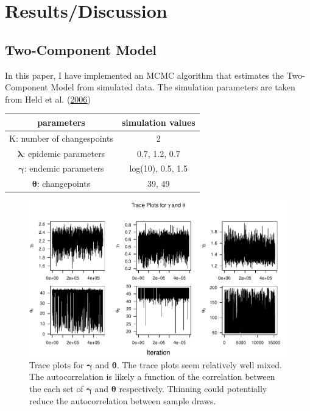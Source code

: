 \documentclass[11pt,a4paper]{article}
\numberwithin{equation}{section}
\begin{document}
\hypertarget{resultsdiscussion}{%
\section{Results/Discussion}\label{resultsdiscussion}}

\hypertarget{two-component-model}{%
\subsection{Two-Component Model}\label{two-component-model}}

In this paper, I have implemented an MCMC algorithm that estimates the
Two-Component Model from simulated data. The simulation parameters are
taken from Held et al.
(\protect\hyperlink{ref-held_two-component_2006}{2006})

\begin{longtable}[]{@{}cc@{}}
\toprule
parameters & simulation values\tabularnewline
\midrule
\endhead
K: number of changespoints & 2\tabularnewline
\(\boldsymbol{\lambda}\): epidemic parameters & 0.7, 1.2,
0.7\tabularnewline
\(\boldsymbol{\gamma}\): endemic parameters & log(10), 0.5,
1.5\tabularnewline
\(\boldsymbol{\theta}\): changepoints & 39, 49\tabularnewline
\bottomrule
\end{longtable}

\begin{figure}
\centering
\includegraphics{thesis_draft_files/figure-latex/lambda_traces_plot-1.pdf}
\caption{\label{fig:lam_trace}Trace plots for \(\boldsymbol{\gamma}\)
and \(\boldsymbol{\theta}\). The trace plots seem relatively well mixed.
The autocorrelation is likely a function of the correlation between the
each set of \(\boldsymbol{\gamma}\) and \(\boldsymbol{\theta}\)
respectively. Thinning could potentially reduce the autocorrelation
between sample draws.}
\end{figure}
\end{document}
